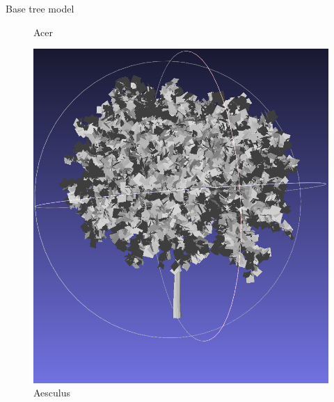 \documentclass[12pt]{beamer}
\begin{document}
\begin{frame}{Base tree model}
\begin{figure}[H]
\begin{minipage}{0.24\textwidth}
        \caption{Acer}
    \end{minipage}\hfill
    \begin{minipage}{0.24\textwidth}
        \centering
        \includegraphics[width=\textwidth]{images/aesculus.png}
        \caption{Aesculus}
    \end{minipage}\hfill
    \begin{minipage}{0.24\textwidth}
        \centering

\end{minipage}
\end{figure}
\end{frame}
\end{document}
